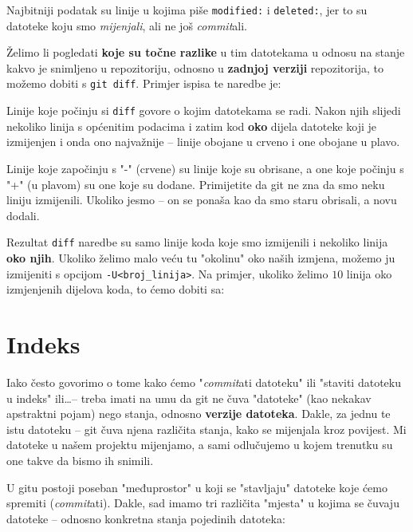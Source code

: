

Najbitniji podatak su linije u kojima piše \verb+modified:+ i \verb+deleted:+, jer to su datoteke koju smo \emph{mijenjali}, ali ne još \emph{commit}ali.

Želimo li pogledati \textbf{koje su točne razlike} u tim datotekama u odnosu na stanje kakvo je snimljeno u repozitoriju, odnosno u \textbf{zadnjoj verziji} repozitorija, to možemo dobiti s \verb+git diff+. 
Primjer ispisa te naredbe je:



Linije koje počinju si \verb+diff+ govore o kojim datotekama se radi.
Nakon njih slijedi nekoliko linija s općenitim podacima i zatim kod \textbf{oko} dijela datoteke koji je izmijenjen i onda ono najvažnije -- linije obojane u crveno i one obojane u plavo.

Linije koje započinju s "-" (crvene) su linije koje su obrisane, a one koje počinju s "+" (u plavom) su one koje su dodane. 
Primijetite da git ne zna da smo neku liniju izmijenili. 
Ukoliko jesmo -- on se ponaša kao da smo staru obrisali, a novu dodali.

Rezultat \verb+diff+ naredbe su samo linije koda koje smo izmijenili i nekoliko linija \textbf{oko njih}.
Ukoliko želimo malo veću tu "okolinu" oko naših izmjena, možemo ju izmijeniti s opcijom \verb+-U<broj_linija>+.
Na primjer, ukoliko želimo $10$ linija oko izmjenjenih dijelova koda, to ćemo dobiti sa:


\section*{Indeks}

Iako često govorimo o tome kako ćemo "\emph{commit}ati datoteku" ili "staviti datoteku u indeks" ili\dots -- treba imati na umu da git ne čuva "datoteke" (kao nekakav apstraktni pojam) nego stanja, odnosno \textbf{verzije datoteka}.
Dakle, za jednu te istu datoteku -- git čuva njena različita stanja, kako se mijenjala kroz povijest.
Mi datoteke u našem projektu mijenjamo, a sami odlučujemo u kojem trenutku su one takve da bismo ih snimili.

U gitu postoji poseban "međuprostor" u koji se "stavljaju" datoteke koje ćemo spremiti (\emph{commit}ati).
Dakle, sad imamo tri različita "mjesta" u kojima se čuvaju datoteke -- odnosno konkretna stanja pojedinih datoteka:

